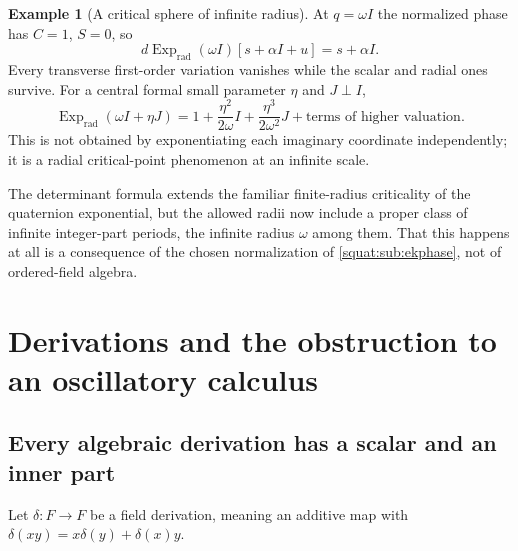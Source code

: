 \documentclass[11pt,letterpaper]{article}
\numberwithin{equation}{section}
\theoremstyle{definition}
\newtheorem{example}[example]{Example}
\theoremstyle{remark}
\newcommand{\Exp}{\operatorname{Exp}}
\newcommand{\Expr}{\Exp_{\mathrm{rad}}}
\begin{document}
\begin{example}[A critical sphere of infinite radius]\label{squat:ex:criticalsphere}
At $q=\omega I$ the normalized phase has $C=1$, $S=0$, so
\[
 d\Expr(\omega I)[s+\alpha I+u]=s+\alpha I .
\]
Every transverse first-order variation vanishes while the scalar and radial ones survive.
For a central formal small parameter $\eta$ and $J\perp I$,
\[
 \Expr(\omega I+\eta J)=1+\frac{\eta^2}{2\omega}I+\frac{\eta^3}{2\omega^2}J
 +\text{terms of higher valuation}.
\]
This is not obtained by exponentiating each imaginary coordinate independently; it is a
radial critical-point phenomenon at an infinite scale.
\end{example}

The determinant formula extends the familiar finite-radius criticality of the quaternion
exponential, but the allowed radii now include a proper class of infinite integer-part
periods, the infinite radius $\omega$ among them. That this happens at all is a consequence
of the chosen normalization of \cref{squat:sub:ekphase}, not of ordered-field algebra.

\section{Derivations and the obstruction to an oscillatory calculus}\label{squat:sec:derivations}

\subsection{Every algebraic derivation has a scalar and an inner part}\label{squat:sub:derivclass}
Let $\delta:F\to F$ be a field derivation, meaning an additive map with
$\delta(xy)=x\delta(y)+\delta(x)y$.
\end{document}
